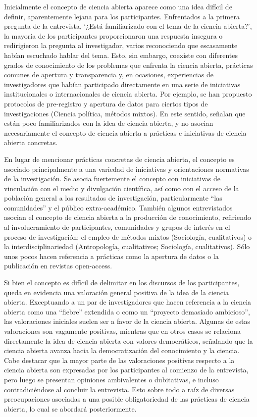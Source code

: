 \documentclass[
  letterpaper,
  DIV=11,
  numbers=noendperiod]{scrreprt}
\begin{document}
Inicialmente el concepto de ciencia abierta aparece como una idea
difícil de definir, aparentemente lejana para los participantes.
Enfrentados a la primera pregunta de la entrevista, `¿Está familiarizado
con el tema de la ciencia abierta?', la mayoría de los participantes
proporcionaron una respuesta insegura o redirigieron la pregunta al
investigador, varios reconociendo que escasamente habían escuchado
hablar del tema. Esto, sin embargo, coexiste con diferentes grados de
conocimiento de los problemas que enfrenta la ciencia abierta, prácticas
comunes de apertura y transparencia y, en ocasiones, experiencias de
investigadores que habían participado directamente en una serie de
iniciativas institucionales o internacionales de ciencia abierta. Por
ejemplo, se han propuesto protocolos de pre-registro y apertura de datos
para ciertos tipos de investigaciones (Ciencia política, métodos
mixtos). En este sentido, señalan que están poco familiarizados con la
idea de ciencia abierta, y no asocian necesariamente el concepto de
ciencia abierta a prácticas e iniciativas de ciencia abierta concretas.

En lugar de mencionar prácticas concretas de ciencia abierta, el
concepto es asociado principalmente a una variedad de iniciativas y
orientaciones normativas de la investigación. Se asocia fuertemente el
concepto con iniciativas de vinculación con el medio y divulgación
científica, así como con el acceso de la población general a los
resultados de investigación, particularmente ``las comunidades'' y el
público extra-académico. También algunos entrevistados asocian el
concepto de ciencia abierta a la producción de conocimiento, refiriendo
al involucramiento de participantes, comunidades y grupos de interés en
el proceso de investigación; el empleo de métodos mixtos (Sociología,
cualitativos) o la interdisciplinariedad (Antropología, cualitativos;
Sociología, cualitativos). Sólo unos pocos hacen referencia a prácticas
como la apertura de datos o la publicación en revistas open-access.

Si bien el concepto es difícil de delimitar en los discursos de los
participantes, queda en evidencia una valoración general positiva de la
idea de la ciencia abierta. Exceptuando a un par de investigadores que
hacen referencia a la ciencia abierta como una ``fiebre'' extendida o
como un ``proyecto demasiado ambicioso'', las valoraciones iniciales
suelen ser a favor de la ciencia abierta. Algunas de estas valoraciones
son vagamente positivas, mientras que en otros casos se relaciona
directamente la idea de ciencia abierta con valores democráticos,
señalando que la ciencia abierta avanza hacia la democratización del
conocimiento y la ciencia. Cabe destacar que la mayor parte de las
valoraciones positivas respecto a la ciencia abierta son expresadas por
los participantes al comienzo de la entrevista, pero luego se presentan
opiniones ambivalentes o dubitativas, e incluso contradiciéndose al
concluir la entrevista. Esto sobre todo a raíz de diversas
preocupaciones asociadas a una posible obligatoriedad de las prácticas
de ciencia abierta, lo cual se abordará posteriormente.
\end{document}
